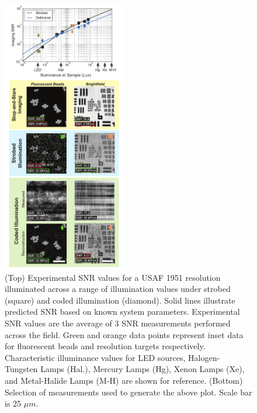 \begin{figure}
\centering
\includegraphics[width=0.48\textwidth]{figures/fig_highthroughput_snr_comparison.pdf}
  \caption{\label{fig:experimental_comparison}(Top) Experimental SNR values for a USAF 1951 resolution illuminated across a range of illumination values under strobed (square) and coded illumination (diamond). Solid lines illustrate predicted SNR based on known system parameters. Experimental SNR values are the average of 3 SNR measurements performed across the field. Green and orange data points represent inset data for fluorescent beads and resolution targets respectively. Characteristic illuminance values for LED sources, Halogen-Tungsten Lamps (Hal.), Mercury Lamps (Hg), Xenon Lamps (Xe), and Metal-Halide Lamps (M-H) are shown for reference. (Bottom) Selection of measurements used to generate the above plot. Scale bar is 25 $\mu m$.}

\end{figure}

